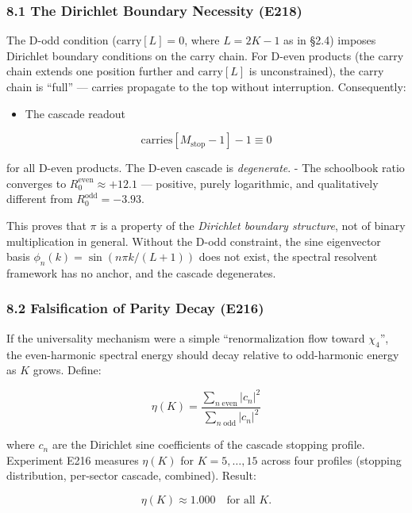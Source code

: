 \documentclass[
  11pt,
]{article}
\providecommand{\tightlist}{%
  \setlength{\itemsep}{0pt}\setlength{\parskip}{0pt}}
\begin{document}
\subsubsection{8.1 The Dirichlet Boundary Necessity
(E218)}\label{the-dirichlet-boundary-necessity-e218}

The D-odd condition (\(\mathrm{carry}[L] = 0\), where \(L = 2K - 1\) as in §2.4)
imposes Dirichlet boundary conditions on the carry chain. For D-even products
(the carry chain extends one position further and \(\mathrm{carry}[L]\) is
unconstrained), the carry chain is ``full'' --- carries propagate to the top
without interruption. Consequently:

\begin{itemize}
\tightlist
\item
  The cascade readout
\end{itemize}

\[\mathrm{carries}[M_{\mathrm{stop}}-1] - 1 \equiv 0\]

for all D-even products. The D-even cascade is \emph{degenerate}. - The
schoolbook ratio converges to \(R_0^{\mathrm{even}} \approx +12.1\) ---
positive, purely logarithmic, and qualitatively different from
\(R_0^{\mathrm{odd}} = -3.93\).

This proves that \(\pi\) is a property of the \emph{Dirichlet boundary
structure}, not of binary multiplication in general. Without the D-odd
constraint, the sine eigenvector basis \(\phi_n(k) = \sin(n\pi k/(L+1))\) does
not exist, the spectral resolvent framework has no anchor, and the cascade
degenerates.

\subsubsection{8.2 Falsification of Parity Decay
(E216)}\label{falsification-of-parity-decay-e216}

If the universality mechanism were a simple ``renormalization flow toward
\(\chi_4\)'', the even-harmonic spectral energy should decay relative to
odd-harmonic energy as \(K\) grows. Define:

\[\eta(K) = \frac{\sum_{n\;\mathrm{even}} |c_n|^2}{\sum_{n\;\mathrm{odd}} |c_n|^2}\]

where \(c_n\) are the Dirichlet sine coefficients of the cascade stopping
profile. Experiment E216 measures \(\eta(K)\) for \(K = 5, \ldots, 15\) across
four profiles (stopping distribution, per-sector cascade, combined). Result:

\[\eta(K) \approx 1.000 \quad \text{for all } K.\]
\end{document}
